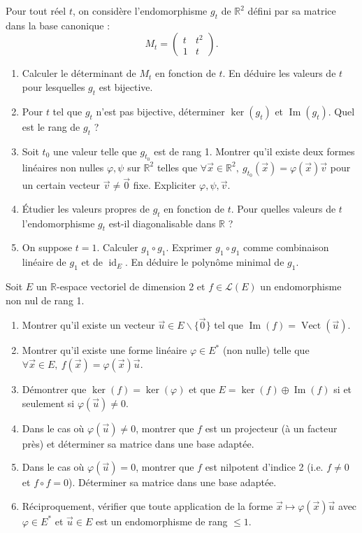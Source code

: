 \documentclass[11pt]{article}
\def\setminus{\mathbin{\backslash}}\let\smallsetminus\setminus
\begin{document}
\begin{exercice}
Pour tout réel $t$, on considère l'endomorphisme $g_t$ de $\mathbb{R}^2$ défini par sa matrice dans la base canonique :
$$M_t = \begin{pmatrix} t & t^2 \\ 1 & t \end{pmatrix}.$$
\begin{enumerate}
    \item Calculer le déterminant de $M_t$ en fonction de $t$. En déduire les valeurs de $t$ pour lesquelles $g_t$ est bijective.
    \item Pour $t$ tel que $g_t$ n'est pas bijective, déterminer $\ker(g_t)$ et $\operatorname{Im}(g_t)$. Quel est le rang de $g_t$ ?
    \item Soit $t_0$ une valeur telle que $g_{t_0}$ est de rang 1. Montrer qu'il existe deux formes linéaires non nulles $\varphi, \psi$ sur $\mathbb{R}^2$ telles que $\forall \vec{x} \in \mathbb{R}^2,\ g_{t_0}(\vec{x}) = \varphi(\vec{x}) \vec{v}$ pour un certain vecteur $\vec{v} \neq \vec{0}$ fixe. Expliciter $\varphi, \psi, \vec{v}$.
    \item Étudier les valeurs propres de $g_t$ en fonction de $t$. Pour quelles valeurs de $t$ l'endomorphisme $g_t$ est-il diagonalisable dans $\mathbb{R}$ ?
    \item On suppose $t=1$. Calculer $g_1 \circ g_1$. Exprimer $g_1 \circ g_1$ comme combinaison linéaire de $g_1$ et de $\operatorname{id}_E$. En déduire le polynôme minimal de $g_1$.
\end{enumerate}
\end{exercice}

\begin{exercice}
Soit $E$ un $\mathbb{R}$-espace vectoriel de dimension 2 et $f \in \mathcal{L}(E)$ un endomorphisme non nul de rang 1.
\begin{enumerate}
    \item Montrer qu'il existe un vecteur $\vec{u} \in E \setminus \{\vec{0}\}$ tel que $\operatorname{Im}(f) = \operatorname{Vect}(\vec{u})$.
    \item Montrer qu'il existe une forme linéaire $\varphi \in E^*$ (non nulle) telle que $\forall \vec{x} \in E,\ f(\vec{x}) = \varphi(\vec{x})\vec{u}$.
    \item Démontrer que $\ker(f) = \ker(\varphi)$ et que $E = \ker(f) \oplus \operatorname{Im}(f)$ si et seulement si $\varphi(\vec{u}) \neq 0$.
    \item Dans le cas où $\varphi(\vec{u}) \neq 0$, montrer que $f$ est un projecteur (à un facteur près) et déterminer sa matrice dans une base adaptée.
    \item Dans le cas où $\varphi(\vec{u}) = 0$, montrer que $f$ est nilpotent d'indice 2 (i.e. $f \neq 0$ et $f \circ f = 0$). Déterminer sa matrice dans une base adaptée.
    \item Réciproquement, vérifier que toute application de la forme $\vec{x} \mapsto \varphi(\vec{x})\vec{u}$ avec $\varphi \in E^*$ et $\vec{u} \in E$ est un endomorphisme de rang $\le 1$.
\end{enumerate}
\end{exercice}
\end{document}
